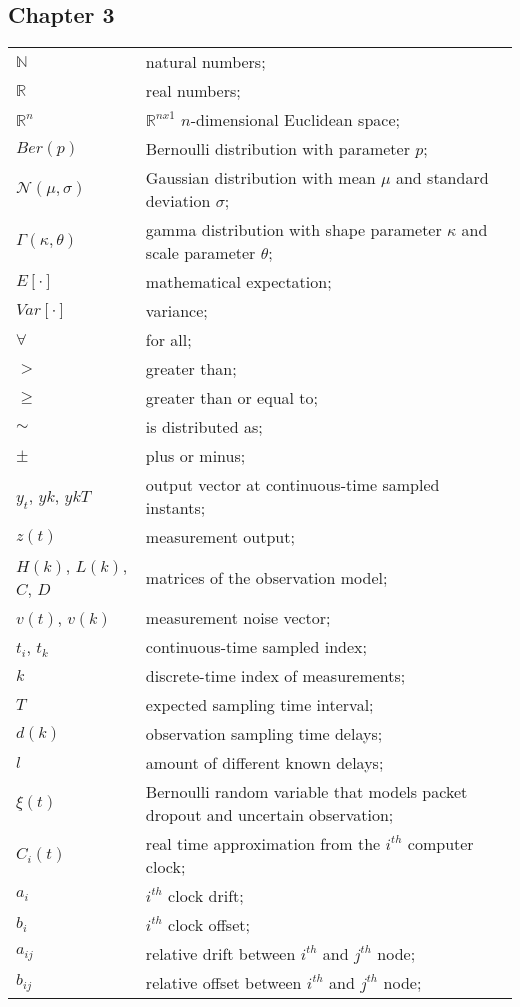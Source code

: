 \subsection*{Chapter 3}

\begin{longtable}{ll}
	$\mathbb{N}$			& natural numbers; \\
	$\mathbb{R}$			& real numbers; \\
	$\mathbb{R}^n$			& $\mathbb{R}^{nx1}$ $n$-dimensional Euclidean space; \\
	
	$Ber(p)$				& Bernoulli distribution with parameter $p$; \\
	$\mathcal{N}(\mu,\sigma)$ & Gaussian distribution with mean $\mu$ and standard deviation $\sigma$; \\
	$\Gamma(\kappa,\theta)$	& gamma distribution with shape parameter $\kappa$ and scale parameter $\theta$; \\
	$E[\mathord{\cdot}]$	& mathematical expectation; \\
	$Var[\mathord{\cdot}]$	& variance; \\
	
	$\forall$				& for all; \\
	$>$						& greater than; \\
	$\geq$					& greater than or equal to; \\
	$\sim$					& is distributed as; \\
	$\pm$					& plus or minus; \\
	
	$y_{t}$, $y{k}$, $y{kT}$& output vector at continuous-time sampled instants;\\
	$z(t)$					& measurement output; \\
	$H(k)$, $L(k)$, $C$, $D$& matrices of the observation model; \\
	$v(t)$, $v(k)$			& measurement noise vector; \\
	$t_i$, $t_k$			& continuous-time sampled index; \\
	$k$						& discrete-time index of measurements;  \\
	$T$						& expected sampling time interval; \\
	$d(k)$					& observation sampling time delays; \\
	$l$						& amount of different known delays; \\
	$\xi(t)$				& Bernoulli random variable that models packet dropout and uncertain observation; \\
	$C_i(t)$				& real time approximation from the $i^{th}$ computer clock; \\
	$a_i$					& $i^{th}$ clock drift; \\
	$b_i$					& $i^{th}$ clock offset; \\
	$a_{ij}$				& relative drift between $i^{th}$ and $j^{th}$ node; \\
	$b_{ij}$				& relative offset between $i^{th}$ and $j^{th}$ node; \\


\end{longtable}

